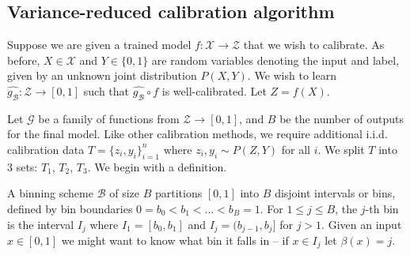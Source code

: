 
\subsection{Variance-reduced calibration algorithm}

Suppose we are given a trained model $f: \mathcal{X} \to \mathcal{Z}$ that we wish to calibrate. As before, $X \in \mathcal{X}$ and $Y \in \{0, 1\}$ are random variables denoting the input and label, given by an unknown joint distribution $P(X, Y)$.  We wish to learn $\hat{g_{\mathcal{B}}} : \mathcal{Z} \to [0, 1]$ such that $\hat{g_{\mathcal{B}}} \circ f$ is well-calibrated.  Let $Z = f(X)$.

Let $\mathcal{G}$ be a family of functions from $\mathcal{Z} \to [0, 1]$, and $B$ be the number of outputs  for the final model. Like other calibration methods, we require additional i.i.d. calibration data $T = \{ z_i, y_i \}_{i=1}^n$ where $z_i, y_i \sim P(Z, Y)$ for all $i$. We split $T$ into 3 sets: $T_1$, $T_2$, $T_3$. We begin with a definition.

\begin{definition}
A binning scheme $\mathcal{B}$ of size $B$ partitions $[0, 1]$ into $B$ disjoint intervals or bins, defined by bin boundaries $0 = b_0 < b_1 < ... < b_B = 1$. For $1 \leq j \leq B$, the $j$-th bin is the interval $I_j$ where $I_1 = [b_0, b_1]$ and $I_j = (b_{j-1}, b_j]$ for $j > 1$. Given an input $x \in [0, 1]$ we might want to know what bin it falls in -- if $x \in I_j$ let $\beta(x) = j$.
\end{definition}

